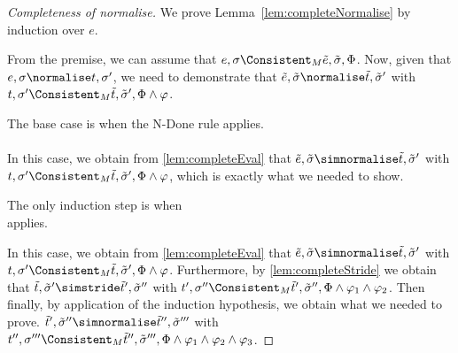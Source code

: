 \begin{proof}[Completeness of normalise]
  We prove Lemma~\ref{lem:completeNormalise} by induction over $e$.

  From the premise, we can assume that $e,\sigma\Consistent_M\tilde{e},\tilde{\sigma},\Phi$.
  Now, given that $e,\sigma\normalise t,\sigma'$,
  we need to demonstrate that $\tilde{e},\tilde{\sigma}\normalise \tilde{t},\tilde{\sigma}'$ with $t,\sigma'\Consistent_M\tilde{t},\tilde{\sigma}',\Phi\land\phi$.

  The base case is when the N-Done rule applies.\\
  \\

  In this case, we obtain from \cref{lem:completeEval} that
  $\tilde{e},\tilde{\sigma}\simnormalise \tilde{t},\tilde{\sigma}'$ with $t,\sigma'\Consistent_M\tilde{t},\tilde{\sigma}',\Phi\land\phi$,
  which is exactly what we needed to show.

  The only induction step is when\\
   applies.

  In this case, we obtain from \cref{lem:completeEval} that
  $\tilde{e},\tilde{\sigma}\simnormalise \tilde{t},\tilde{\sigma}'$ with $t,\sigma'\Consistent_M\tilde{t},\tilde{\sigma}',\Phi\land\phi$.
  Furthermore, by \cref{lem:completeStride} we obtain that
  $\tilde{t},\tilde{\sigma}'\simstride \tilde{t}',\tilde{\sigma}''$ with $t',\sigma''\Consistent_M\tilde{t}',\tilde{\sigma}'',\Phi\land\phi_1\land\phi_2$.
  Then finally, by application of the induction hypothesis, we obtain what we needed to prove.
  $\tilde{t}',\tilde{\sigma}''\simnormalise \tilde{t}'',\tilde{\sigma}'''$ with $t'',\sigma'''\Consistent_M\tilde{t}'',\tilde{\sigma}''',\Phi\land\phi_1\land\phi_2\land\phi_3$.
\end{proof}

